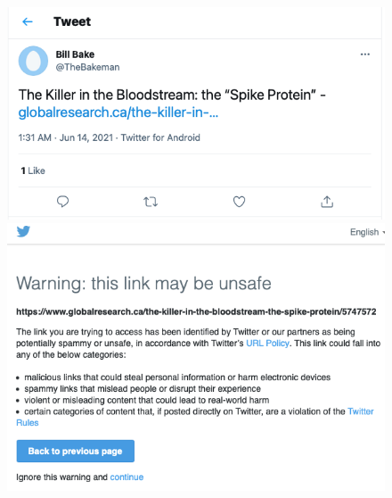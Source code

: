 \documentclass{article}
\begin{document}
\begin{figure}
\centering	
	\begin{multicols}{1}
		\includegraphics[scale=0.35]{./img/globalresearch/tweet.png} 
		\includegraphics[scale=0.35]{./img/globalresearch/warning.png}
	\end{multicols}
\caption{}
\label{fig4bis}
\end{figure}



\end{document}
